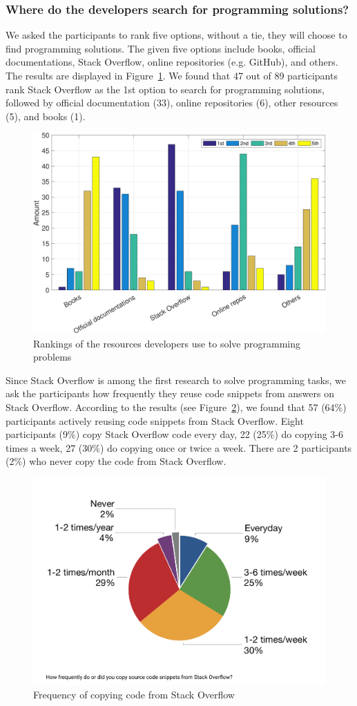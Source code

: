 \documentclass{svjour3}                     %
\begin{document}
\subsubsection*{Where do the developers search for programming solutions?}

We asked the participants to rank five options, without a tie, they will choose
to find programming solutions. The given five options include books, official
documentations, Stack Overflow, online repositories (e.g. GitHub), and others.
The results are displayed in Figure~\ref{fig:survey_visitor_rankings-crop}. We
found that 47 out of 89 participants rank Stack Overflow as the 1st option to
search for programming solutions, followed by official documentation (33),
online repositories (6), other resources (5), and books (1).

\begin{figure} \centering
	\includegraphics[width=.5\linewidth]{survey_visitor_rankings-crop} 
	\caption{Rankings of the resources developers use to solve programming problems}
	\label{fig:survey_visitor_rankings-crop} 
\end{figure}

Since Stack Overflow is among the first research to solve programming tasks, we
ask the participants how frequently they reuse code snippets from answers on
Stack Overflow. According to the results (see
Figure~\ref{fig:survey_visitor_frequency_so_copy-crop}), we found that 57 (64\%)
participants actively reusing code snippets from Stack Overflow. Eight
participants (9\%) copy Stack Overflow code every day, 22 (25\%) do copying 3-6
times a week, 27 (30\%) do copying once or twice a week. There are 2
participants (2\%) who never copy the code from Stack Overflow.

\begin{figure} \centering
	\includegraphics[width=.5\linewidth]{survey_visitor_frequency_so_copy} 
	\caption{Frequency of copying code from Stack Overflow}
	\label{fig:survey_visitor_frequency_so_copy-crop} 
\end{figure}
\end{document}
